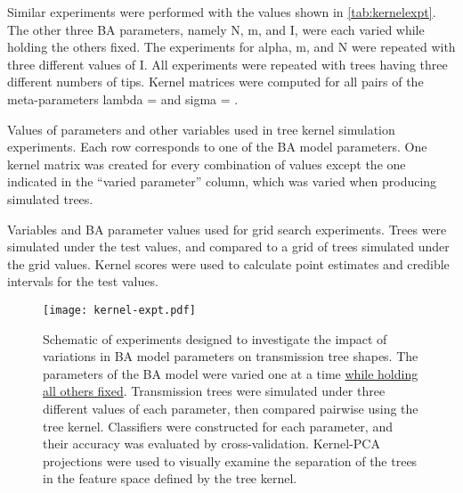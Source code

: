 Similar experiments were performed with the values shown in
\cref{tab:kernelexpt}. The other three \gls{BA} parameters, namely \gls{N},
\gls{m}, and \gls{I}, were each varied while holding the others fixed. The
experiments for \gls{alpha}, \gls{m}, and \gls{N} were repeated with three
different values of \gls{I}. All experiments were repeated with trees having
three different numbers of tips. Kernel matrices were computed for all pairs of
the meta-parameters \gls{lambda} =  and \gls{sigma} =
.

\begin{landscape}
\begin{table}[ht]
  \centering
  
  \caption[Variables used in tree kernel simulation experiments]
  {
    Values of parameters and other variables used in tree kernel simulation
    experiments. Each row corresponds to one of the \gls{BA} model parameters.
    One kernel matrix was created for every combination of values except the
    one indicated in the ``varied parameter'' column, which was varied when
    producing simulated trees.
  }
  \label{tab:kernelexpt}
\end{table}

\begin{table}[ht]
  \centering
  
  \caption[Variables used in grid search experiments]
  {
    Variables and \gls{BA} parameter values used for grid search experiments. 
    Trees were simulated under the test values, and compared to a grid of trees
    simulated under the grid values. Kernel scores were used to calculate point
    estimates and credible intervals for the test values.
  }
  \label{tab:gridexpt}
\end{table}
\end{landscape}

\begin{figure}[ht]
  \centering
  \texttt{[image: kernel-expt.pdf]}
  \caption[Schematic of experiments investigating impact of BA model parameters
           on tree shape.]{
    Schematic of experiments designed to investigate the impact of variations
    in BA model parameters on transmission tree shapes. The parameters of the
    BA model were varied one at a time {\color{blue}\uline{while holding all
    others fixed}}. Transmission trees were simulated under three different
    values of each parameter, then compared pairwise using the tree kernel.
    Classifiers were constructed for each parameter, and their accuracy was
    evaluated by cross-validation. Kernel-PCA projections were used to visually
    examine the separation of the trees in the feature space defined by the
    tree kernel.
  }
  \label{fig:kernelexpt}
\end{figure}


